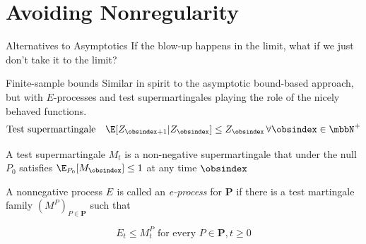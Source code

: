 \documentclass[aspectratio=169, professionalfonts]{beamer}
\newcommand{\prode}[2]{E_{#1}^{#2}}
\begin{document}




\section{Avoiding Nonregularity}
\begin{frame}{Alternatives to Asymptotics}
	If the blow-up happens in the limit, what if we just don't take it to the limit?
\end{frame}

\begin{frame}{Finite-sample bounds}
	Similar in spirit to the asymptotic bound-based approach, but with
	$E$-processes and test	supermartingales playing the role of the nicely behaved functions.
	\vfill
	\[\text{Test supermartingale} \quad \E[Z_{\obsindex + 1} | Z_{\obsindex}] \leq
		Z_{\obsindex} \, \forall \obsindex \in \mbbN^+ \]

	\vfill \pause

	A test supermartingale $M_t$ is a non-negative supermartingale that under
	the null $P_0$ satisfies $\E_{P_0}[M_\obsindex] \leq 1$ at any time $\obsindex$

	\vfill \pause

	A nonnegative process $\prode{}{}$ is called an \emph{e-process} for $\symbf{P}$
	if there is a test martingale family $(M^P)_{P \in \symbf{P}}$ such that

	$$\prode{t}{} \leq M_{t}^{P} \text{ for every } P \in \symbf{P},  t \geq 0$$
\end{frame}


\end{document}
